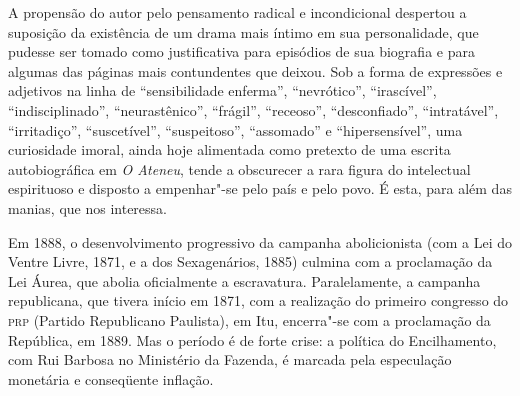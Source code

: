 A propensão do autor pelo pensamento radical e
incondicional despertou a suposição da existência de um drama mais
íntimo em sua personalidade, que pudesse ser tomado como justificativa
para episódios de sua biografia e para algumas das páginas mais
contundentes que deixou. Sob a forma de expressões e adjetivos na linha
de ``sensibilidade enferma'', ``nevrótico'', ``irascível'', ``indisciplinado'',
``neurastênico'', ``frágil'', ``receoso'', ``desconfiado'', ``intratável'',
``irritadiço'', ``suscetível'', ``suspeitoso'', ``assomado'' e ``hipersensível'',
uma curiosidade imoral, ainda hoje alimentada como pretexto de uma
escrita autobiográfica em \textit{O Ateneu},
tende a obscurecer a rara figura do intelectual espirituoso e disposto
a empenhar"-se pelo país e pelo povo. É esta, para além das manias,
que nos interessa.

Em 1888, o desenvolvimento progressivo da campanha abolicionista (com a
Lei do Ventre Livre, 1871, e a dos Sexagenários, 1885) culmina com a
proclamação da Lei Áurea, que abolia oficialmente a escravatura.
Paralelamente, a campanha republicana, que tivera início em 1871, com a
realização do primeiro congresso do \textsc{prp} (Partido Republicano Paulista),
em Itu, encerra"-se com a proclamação da República, em 1889. Mas o
período é de forte crise: a política do Encilhamento, com Rui Barbosa
no Ministério da Fazenda, é marcada pela especulação monetária e
conseqüente inflação.

